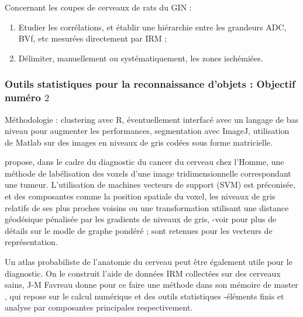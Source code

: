 Concernant les coupes de cerveaux de rats du GIN :


\begin{enumerate}[label=\textbf{(Objectif \ \arabic*)}]
\item Etudier les corr\'elations, et \'etablir une hi\'erarchie entre les grandeurs ADC, BVf, etc mesur\'ees directement par IRM ;
\item D\'elimiter, manuellement ou syst\'ematiquement, les zones isch\'emi\'ees.
\end{enumerate}

\subsubsection{Outils statistiques pour la reconnaissance d'objets : Objectif num\'ero $2$}

M\'ethodologie : clustering avec R, \'eventuellement interfac\'e avec un langage de bas niveau pour augmenter les performances, %
segmentation avec ImageJ, utilisation de Matlab sur des images en niveaux de gris cod\'ees sous forme matricielle.

\etoile
\cite{dol_cmi_16} propose, dans le cadre du diagnostic du cancer du cerveau chez l'Homme, une m\'ethode de lab\'elisation des voxels d'une image tridimensionnelle %
correspondant  une tumeur. %
L'utilisation de machines  vecteurs de support (SVM) est pr\'econis\'ee, et des composantes comme la position spatiale du voxel, %
les niveaux de gris relatifs de ses plus proches voisins ou une transformation utilisant une distance g\'eod\'esique p\'enalis\'ee par les gradients de niveaux de gris, %
-voir \cite{wei_geo_08} pour plus de d\'etails sur le modle de graphe pond\'er\'e ; sont retenues pour les vecteurs de repr\'esentation.

\par
Un atlas probabiliste de l'anatomie du cerveau peut \^etre \'egalement utile pour le diagnostic. On le construit  l'aide de donn\'ees IRM collect\'ees sur des cerveaux sains, %
J-M Favreau donne pour ce faire une m\'ethode dans son m\'emoire de master \cite{fav_iss_05}, qui repose sur le calcul num\'erique et des outils statistiques -\'el\'ements finis et analyse par composantes principales respectivement.

